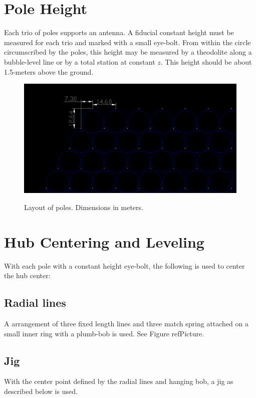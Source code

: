 \documentclass[11pt]{article}
\begin{document}
\section{Pole Height}
Each trio of poles supports an antenna.  A fiducial constant height must be measured for each trio and marked with a small eye-bolt.  From within the circle circumscribed by the poles, this height may be measured by a theodolite along a bubble-level line or by a total station at constant $z$.  This height should be about 1.5-meters above the ground.
\begin{figure}[H]
\includegraphics[width=\textwidth]{graphics/poles_and_ants.png}
\label{fig:poles_ants}
\caption{Layout of poles.  Dimensions in meters.}
\end{figure}

\section{Hub Centering and Leveling}
With each pole with a constant height eye-bolt, the following is used to center the hub center:
\subsection{Radial lines}
A arrangement of three fixed length lines and three match spring attached on a small inner ring with a plumb-bob is used. See Figure refPicture.

\subsection{Jig}
With the center point defined by the radial lines and hanging bob, a jig as described below is used.




\end{document}
